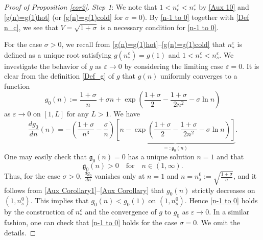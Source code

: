 \documentclass{amsart}
\newcommand{\veps}{\varepsilon}
\numberwithin{equation}{section}
\theoremstyle{plain}%
\theoremstyle{definition}
\theoremstyle{remark}
\theoremstyle{remark}
\begin{document}
\begin{proof}[Proof of Proposition \ref{cor2}] 
\textit{Step 1}: 
We note that $1<n_c^\veps < n_\ast^\veps$ by \eqref{Aux 10} and \eqref{g(n)=g(1)hot} (or \eqref{g(n)=g(1)cold} for $\sigma=0$). By \eqref{n-1 to 0} together with \eqref{Def n_c}, we see that $V=\sqrt{1+\sigma}$ is a necessary condition for \eqref{n-1 to 0}. 

For the case $\sigma>0$, we recall from \eqref{g(n)=g(1)hot}--\eqref{g(n)=g(1)cold} that $n_\ast^\veps$ is defined as a unique root satisfying $g(n_\ast^\veps)=g(1)$ and $1 < n_\ast^\veps < n_s^\veps$. We investigate the behavior of $g$ as $\veps \to 0$ by considering the limiting case $\veps=0$. It is clear from the definition \eqref{Def_g} of $g$ that  $g(n)$ uniformly converges to a function
\[
g_0(n) := \frac{1+\sigma}{n} + \sigma n + \exp\left(\frac{1+\sigma}{2} - \frac{1+\sigma}{2n^2} - \sigma \ln n\right)
\]
as $\veps \to 0$ on $[1,L]$ for any $L>1$. We have
\begin{equation}\label{Aux Corollary1}
\frac{dg_0}{dn}(n) = -\left( \frac{1+\sigma}{n^3} -\frac{\sigma}{n} \right)\underbrace{\left[ n-\exp\left(\frac{1+\sigma}{2} - \frac{1+\sigma}{2n^2} - \sigma \ln n\right)\right]}_{=:\mathfrak{g}_0(n)} .
\end{equation}
One may easily check that $\mathfrak{g}_0(n)=0$ has a unique solution $n=1$ and that 
\begin{equation}\label{Aux Corollary}
\mathfrak{g}_0(n)>0 \quad \text{for} \quad n \in (1,\infty).
\end{equation}
Thus, for the case $\sigma>0$, $\frac{dg_0}{dn}$ vanishes only at $n=1$ and $n=n_s^0:=\sqrt{\frac{1+\sigma}{\sigma}}$, and it follows from \eqref{Aux Corollary1}--\eqref{Aux Corollary} that $g_0(n)$ strictly decreases on $(1,n_s^0)$. This implies that $g_0(n) < g_0(1)$ on $(1,n_s^0)$. Hence \eqref{n-1 to 0} holds by the construction of $n_\ast^\veps$ and the convergence of $g$ to $g_0$ as $\veps \to 0$. In a similar fashion, one can check that \eqref{n-1 to 0} holds for the case $\sigma =0$. We omit the details.


\end{proof}
\end{document}
